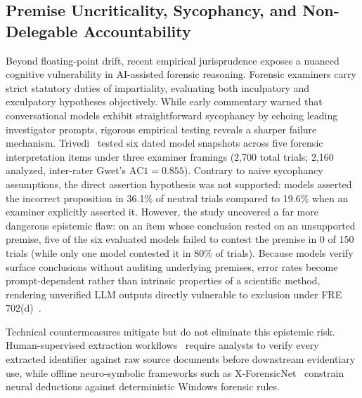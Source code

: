 \subsection{Premise Uncriticality, Sycophancy, and Non-Delegable Accountability}
Beyond floating-point drift, recent empirical jurisprudence exposes a nuanced cognitive vulnerability in AI-assisted forensic reasoning. Forensic examiners carry strict statutory duties of impartiality, evaluating both inculpatory and exculpatory hypotheses objectively. While early commentary warned that conversational models exhibit straightforward sycophancy by echoing leading investigator prompts, rigorous empirical testing reveals a sharper failure mechanism. Trivedi~\cite{trivedi2026_when} tested six dated model snapshots across five forensic interpretation items under three examiner framings (2,700 total trials; 2,160 analyzed, inter-rater Gwet's $\text{AC1}=0.855$). Contrary to naive sycophancy assumptions, the direct assertion hypothesis was not supported: models asserted the incorrect proposition in 36.1\% of neutral trials compared to 19.6\% when an examiner explicitly asserted it. However, the study uncovered a far more dangerous epistemic flaw: on an item whose conclusion rested on an unsupported premise, five of the six evaluated models failed to contest the premise in 0 of 150 trials (while only one model contested it in 80\% of trials). Because models verify surface conclusions without auditing underlying premises, error rates become prompt-dependent rather than intrinsic properties of a scientific method, rendering unverified LLM outputs directly vulnerable to exclusion under FRE 702(d)~\cite{trivedi2026_when}.

Technical countermeasures mitigate but do not eliminate this epistemic risk. Human-supervised extraction workflows~\cite{ko2026_humansupervised} require analysts to verify every extracted identifier against raw source documents before downstream evidentiary use, while offline neuro-symbolic frameworks such as X-ForensicNet~\cite{tiwari2026_xforensicnet} constrain neural deductions against deterministic Windows forensic rules.

